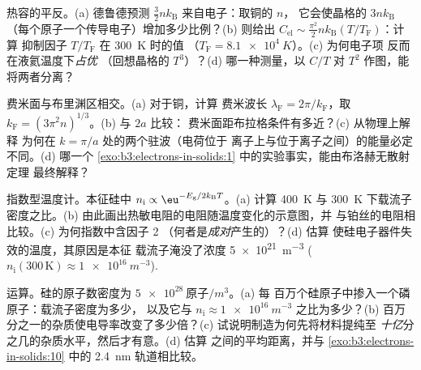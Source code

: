 \begin{exercise}[$\star\star$]\label{exo:b3:electrons-in-solids:6}
热容的平反。(a) 德鲁德预测
$\tfrac32nk_{\text{B}}$ 来自电子：取铜的 $n$，
它会使晶格的
$3nk_{\text{B}}$（每个原子一个传导电子）增加多少比例？(b)
 则给出 $C_{\text{el}}
\sim \tfrac{\pi^2}{2}nk_{\text{B}}(T/T_{\text{F}})$：计算
抑制因子 $T/T_{\text{F}}$ 在 \qty{300}{K} 时的值
（$T_{\text{F}} = \qty{8.1e4}{K}$）。(c) 为何电子项
反而在液氦温度下\emph{占优}
（回想晶格的 $T^3$）？(d) 哪一种测量，以
$C/T$ 对 $T^2$ 作图，能将两者分离？
\end{exercise}

\begin{exercise}[$\star\star$]\label{exo:b3:electrons-in-solids:7}
费米面与布里渊区相交。(a) 对于铜，计算
费米波长 $\lambda_{\text{F}} = 2\pi/k_{\text{F}}$，取 
$k_{\text{F}} = (3\pi^2n)^{1/3}$。(b) 与 $2a$ 比较：
费米面距布拉格条件有多近？(c) 从物理上解释
为何在 $k = \pi/a$ 处的两个驻波（电荷位于
离子上与位于离子之间）的能量必定不同。(d) 哪一个
\cref{exo:b3:electrons-in-solids:1} 中的实验事实，能由布洛赫无散射定理
最终解释？
\end{exercise}

\begin{exercise}[$\star\star$]\label{exo:b3:electrons-in-solids:8}
指数型温度计。本征硅中 $n_{\text{i}}
\propto \eu^{-E_{\text{g}}/2k_{\text{B}}T}$。(a) 计算 
\qty{400}{K} 与 \qty{300}{K} 下载流子密度之比。(b)
由此画出热敏电阻的电阻随温度变化的示意图，并
与铂丝的电阻相比较。(c) 为何指数中含因子 2
（何者是\emph{成对}产生的）？(d) 估算
使硅电子器件失效的温度，其原因是本征
载流子淹没了浓度 \qty{5e21}{m^{-3}}
($n_{\text{i}}(300\,\text{K}) \approx \qty{1e16}{m^{-3}}$).
\end{exercise}

\begin{exercise}[$\star\star$]\label{exo:b3:electrons-in-solids:9}
运算。硅的原子数密度为 $\qty{5e28}{\text{原子}/m^3}$。(a) 每
百万个硅原子中掺入一个磷原子：载流子密度为多少，
以及它与 $n_{\text{i}} \approx \qty{1e16}{m^{-3}}$ 之比为多少？(b)
百万分之一的杂质使电导率改变了多少倍？(c)
试说明制造为何先将材料提纯至
\emph{十亿}分之几的杂质水平，然后才有意。(d) 估算
之间的平均距离，并与 
\cref{exo:b3:electrons-in-solids:10} 中的 \qty{2.4}{nm} 轨道相比较。
\end{exercise}

